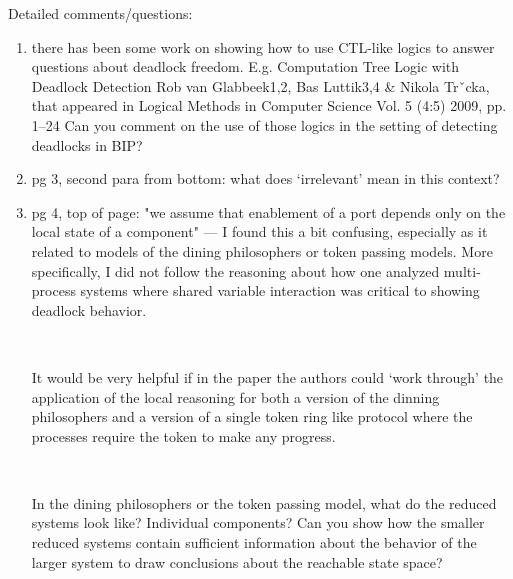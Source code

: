 Detailed comments/questions:
\begin{enumerate}

\item there has been some work on showing how to use CTL-like logics to answer
questions about deadlock freedom.  E.g.
  Computation Tree Logic with Deadlock Detection
  Rob van Glabbeek1,2, Bas Luttik3,4 \& Nikola Trˇcka, that appeared in
  Logical Methods in Computer Science
  Vol. 5 (4:5) 2009, pp. 1–24
Can you comment on the use of those logics in the setting of detecting deadlocks in
BIP?

\item  pg 3, second para from bottom: what does `irrelevant' mean in this context?


\item pg 4, top of page: "we assume that enablement of a port depends only on the
local state of a component" --- I found this a bit confusing, especially as it related
to models of the dining philosophers or token passing models.  More specifically, I
did not follow the reasoning about how one analyzed multi-process systems
where shared variable interaction was critical to showing deadlock behavior.

~

It would be very helpful if in the paper the authors could `work through' the application
of the local reasoning for both a version of the dinning philosophers and a version
of a single token ring like protocol where the processes require the token to make
any progress.

~

 In the dining philosophers or the token passing model, what do the reduced systems
look like? Individual components?  Can you show how the smaller reduced systems
contain sufficient information about the behavior of the larger system to draw conclusions
about the reachable state space?

~




\end{enumerate}
